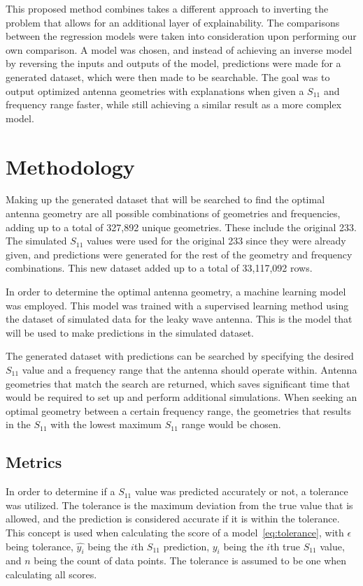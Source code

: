 \documentclass[conference]{IEEEtran}
\begin{document}
This proposed method combines takes a different approach to inverting the problem that allows for an additional layer of explainability. The comparisons between the regression models were taken into consideration upon performing our own comparison. A model was chosen, and instead of achieving an inverse model by reversing the inputs and outputs of the model, predictions were made for a generated dataset, which were then made to be searchable. The goal was to output optimized antenna geometries with explanations when given a $S_{11}$ and frequency range faster, while still achieving a similar result as a more complex model.


\section{Methodology}
Making up the generated dataset that will be searched to find the optimal antenna geometry are all possible combinations of geometries and frequencies, adding up to a total of 327,892 unique geometries. These include the original 233. The simulated $S_{11}$ values were used for the original 233 since they were already given, and predictions were generated for the rest of the geometry and frequency combinations. This new dataset added up to a total of 33,117,092 rows.

In order to determine the optimal antenna geometry, a machine learning model was employed. This model was trained with a supervised learning method using the dataset of simulated data for the leaky wave antenna. This is the model that will be used to make predictions in the simulated dataset.
 
The generated dataset with predictions can be searched by specifying the desired $S_{11}$ value and a frequency range that the antenna should operate within. Antenna geometries that match the search are returned, which saves significant time that would be required to set up and perform additional simulations. When seeking an optimal geometry between a certain frequency range, the geometries that results in the $S_{11}$ with the lowest maximum $S_{11}$ range would be chosen.

\subsection{Metrics}
In order to determine if a $S_{11}$ value was predicted accurately or not, a tolerance was utilized. The tolerance is the maximum deviation from the true value that is allowed, and the prediction is considered accurate if it is within the tolerance. This concept is used when calculating the score of a model~\eqref{eq:tolerance}, with $\epsilon$ being tolerance, $\hat{y_i}$ being the $i$th $S_{11}$ prediction, $y_i$ being the $i$th true $S_{11}$ value, and $n$ being the count of data points. The tolerance is assumed to be one when calculating all scores.
\end{document}
